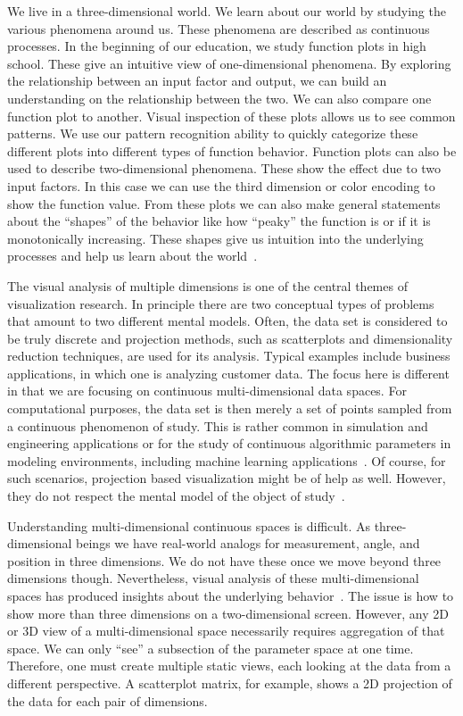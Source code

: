 
We live in a three-dimensional world.  
We learn about our world by studying the various
phenomena around us.  These phenomena are described as continuous processes.
In the beginning of our  education, we study function plots in high school.
These give an intuitive view of one-dimensional phenomena.  
By exploring the
relationship between an input factor
and output,
we can build an understanding on the relationship between the two.  We can also
compare one function plot to another. Visual inspection of these plots allows
us to see common patterns. We use our pattern recognition ability to quickly
categorize these different plots into different types of function behavior.
Function plots can also be used to describe two-dimensional phenomena. These
show the effect due to two input factors. In this case we can use the third
dimension or color encoding to show the function value.  From these plots we
can also make general statements about the ``shapes'' of the behavior like how
``peaky'' the function is or if it is monotonically increasing. These shapes
give us intuition into the underlying processes and help us learn about the
world~\cite{Palmer:1999}.

The visual analysis of multiple dimensions is one of the central themes of
visualization research. In principle there are two conceptual types of problems
that amount to two different mental models. Often, the data set is
considered to be truly discrete and projection methods, such as scatterplots
and dimensionality reduction techniques, are used for its analysis.  Typical
examples include business applications, in which one is analyzing customer
data.  The focus here is different in that we are focusing on
continuous multi-dimensional data spaces. For computational purposes, the data
set is then merely a set of points sampled from a continuous phenomenon of
study. This is rather common in simulation and engineering applications or for
the study of continuous algorithmic parameters in modeling environments,
including machine learning applications~\cite{Sedlmair:2014}. Of course, for
such scenarios, projection based visualization might be of help as well.
However, they do not respect the mental model of the object of
study~\cite{Tory:2004}.

Understanding multi-dimensional continuous spaces is difficult. As
three-dimensional beings we have real-world analogs for measurement, angle, and
position in three dimensions. We do not have these once we move beyond three
dimensions though. Nevertheless, visual analysis of these multi-dimensional
spaces has produced insights about the underlying
behavior~\cite{Sedlmair:2014,gleicher:2016}. The issue is how to show more than
three dimensions on a two-dimensional screen. 
However, any 2D or 3D view of a multi-dimensional space necessarily requires
aggregation of that space.
We can only ``see'' a subsection of the parameter
space at one time.
Therefore, one must create multiple static views, each looking at 
the data from a different perspective.  A scatterplot matrix, for example,
shows a 2D projection of the data for each pair of dimensions.

